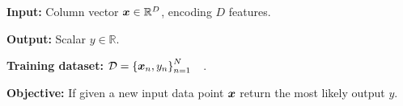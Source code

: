 \documentclass[../../main.tex]{subfiles}
\begin{document}
\textbf{Input:} Column vector $\bm{x} \in \mathbb{R}^D$, encoding $D$ features.

\textbf{Output:} Scalar $y \in \mathbb{R}$.

\textbf{Training dataset:} $\mathcal{D} = {\{\bm{x}_n, y_n\}}_{n=1}^N \quad$.

\textbf{Objective:} If given a new input data point $\bm{x}$ return the most likely output $y$.
\end{document}
